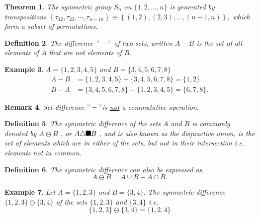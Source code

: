 \documentclass[aps,preprint]{revtex4}%
\providecommand{\U}[1]{\protect\rule{.1in}{.1in}}
\newtheorem{theorem}{Theorem}
\newtheorem{definition}[theorem]{Definition}
\newtheorem{example}[theorem]{Example}
\newtheorem{remark}[theorem]{Remark}
\begin{document}
\begin{theorem}
The symmetric group $S_{n}$ on $\{1,2,\ldots,n\}$ is generated by
\emph{transpositions} $\left\{  \tau_{12},\tau_{23},\cdots,\tau_{n-1n}%
\right\}  \equiv\left\{  (1,2),(2,3),\ldots,(n-1,n)\right\}  ,$ which form a
subset of permutations\emph{.}
\end{theorem}

\begin{definition}
The difference $"-"$ of two sets, written $A-B$ is the set of all elements of
$A$ that are not elements of $B$.
\end{definition}

\begin{example}
$A=\{1,2,3,4,5\}$ and $B=\{3,4,5,6,7,8\}$%
\begin{align}
A-B  &  =\{1,2,3,4,5\}-\{3,4,5,6,7,8\}=\{1,2\}\\
B-A  &  =\{3,4,5,6,7,8\}-\{1,2,3,4,5\}=\{6,7,8\}.
\end{align}

\end{example}

\begin{remark}
Set difference $"-"$is \underline{\emph{not}}\emph{ a commutative} operation.
\end{remark}

\begin{definition}
The symmetric difference of the sets $A$ and $B$ is commonly denoted by
$A\ominus B$ , or $A\triangle\U{2061} B$ , and is also known as the
\emph{disjunctive union}, is the set of elements \emph{which are in either of
the sets, but not in their intersection i.e. elements not in common}.
\end{definition}

\begin{definition}
The symmetric difference can also be expressed as
\begin{equation}
A\ominus B=A\cup B-A\cap B.
\end{equation}

\end{definition}

\begin{example}
Let $A=\{1,2,3\}$ and $B=\{3,4\}.$ The symmetric difference $\{1,2,3\}\ominus
\{3,4\}$ of the sets $\{1,2,3\}$ and $\{3,4\}$ i.e.
\begin{equation}
\{1,2,3\}\ominus\{3,4\}=\{1,2,4\}
\end{equation}

\end{example}
\end{document}

